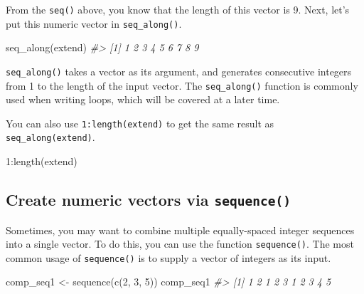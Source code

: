 \documentclass[
]{book}
\newenvironment{Shaded}{\begin{snugshade}}{\end{snugshade}}
\newcommand{\CommentTok}[1]{\textcolor[rgb]{0.56,0.35,0.01}{\textit{#1}}}
\newcommand{\DecValTok}[1]{\textcolor[rgb]{0.00,0.00,0.81}{#1}}
\newcommand{\FunctionTok}[1]{\textcolor[rgb]{0.00,0.00,0.00}{#1}}
\newcommand{\NormalTok}[1]{#1}
\newcommand{\OtherTok}[1]{\textcolor[rgb]{0.56,0.35,0.01}{#1}}
\newcommand{\SpecialCharTok}[1]{\textcolor[rgb]{0.00,0.00,0.00}{#1}}
\newenvironment{blackbox}{
  \definecolor{shadecolor}{rgb}{0, 0, 0}  %
  \color{white}
  \begin{shaded}}
 {\end{shaded}}
\newenvironment{infobox}[1]
  {
  \begin{itemize}
  \renewcommand{\labelitemi}{
    \raisebox{-.7\height}[0pt][0pt]{
      {\setkeys{Gin}{width=3em,keepaspectratio}
        \texttt{[image: pics/\#1]}}
    }
  }
  \setlength{\fboxsep}{1em}
  \begin{blackbox}
  \item
  }
  {
  \end{blackbox}
  \end{itemize}
  }
\begin{document}
From the \texttt{seq()} above, you know that the length of this vector is 9. Next, let's put this numeric vector in \texttt{seq\_along()}.

\begin{Shaded}
\begin{Highlighting}[]
\FunctionTok{seq\_along}\NormalTok{(extend)}
\CommentTok{\#\textgreater{} [1] 1 2 3 4 5 6 7 8 9}
\end{Highlighting}
\end{Shaded}

\texttt{seq\_along()} takes a vector as its argument, and generates consecutive integers from 1 to the length of the input vector. The \texttt{seq\_along()} function is commonly used when writing loops, which will be covered at a later time.

\begin{infobox}{caution}

You can also use \texttt{1:length(extend)} to get the same result as \texttt{seq\_along(extend)}.

\begin{Shaded}
\begin{Highlighting}[]
\DecValTok{1}\SpecialCharTok{:}\FunctionTok{length}\NormalTok{(extend)}
\end{Highlighting}
\end{Shaded}

\end{infobox}

\hypertarget{create-numeric-vectors-via-sequence}{%
\subsection{\texorpdfstring{Create numeric vectors via \texttt{sequence()}}{Create numeric vectors via sequence()}}\label{create-numeric-vectors-via-sequence}}

Sometimes, you may want to combine multiple equally-spaced integer sequences into a single vector. To do this, you can use the function \texttt{sequence()}. The most common usage of \texttt{sequence()} is to supply a vector of integers as its input.

\begin{Shaded}
\begin{Highlighting}[]
\NormalTok{comp\_seq1 }\OtherTok{\textless{}{-}} \FunctionTok{sequence}\NormalTok{(}\FunctionTok{c}\NormalTok{(}\DecValTok{2}\NormalTok{, }\DecValTok{3}\NormalTok{, }\DecValTok{5}\NormalTok{)) }
\NormalTok{comp\_seq1}
\CommentTok{\#\textgreater{}  [1] 1 2 1 2 3 1 2 3 4 5}
\end{Highlighting}
\end{Shaded}
\end{document}
